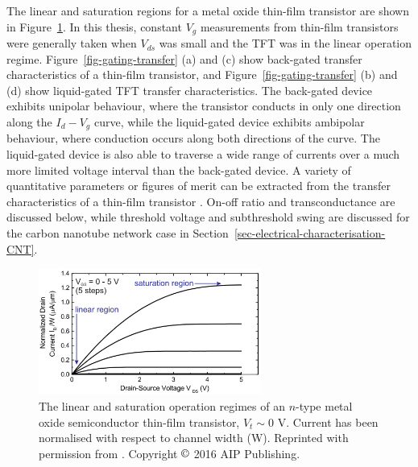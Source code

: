 \documentclass[
  a4paper,
]{scrbook}
\begin{document}
The linear and saturation regions for a metal oxide thin-film transistor
are shown in Figure~\ref{fig-linear-region}. In this thesis, constant
\(V_g\) measurements from thin-film transistors were generally taken
when \(V_{ds}\) was small and the TFT was in the linear operation
regime. Figure~\ref{fig-gating-transfer} (a) and (c) show back-gated
transfer characteristics of a thin-film transistor, and
Figure~\ref{fig-gating-transfer} (b) and (d) show liquid-gated TFT
transfer characteristics. The back-gated device exhibits unipolar
behaviour, where the transistor conducts in only one direction along the
\(I_d - V_g\) curve, while the liquid-gated device exhibits ambipolar
behaviour, where conduction occurs along both directions of the curve.
The liquid-gated device is also able to traverse a wide range of
currents over a much more limited voltage interval than the back-gated
device. A variety of quantitative parameters or figures of merit can be
extracted from the transfer characteristics of a thin-film transistor
\autocite{Petti2016}. On-off ratio and transconductance are discussed
below, while threshold voltage and subthreshold swing are discussed for
the carbon nanotube network case in
Section~\ref{sec-electrical-characterisation-CNT}.

\begin{figure}

{\centering \includegraphics[width=0.65\textwidth,height=\textheight]{figures/ch2/linear_region_edit.png}

}

\caption[The linear and saturation operation regimes of an \(n\)-type
metal oxide semiconductor thin-film
transistor.]{\label{fig-linear-region}The linear and saturation
operation regimes of an \(n\)-type metal oxide semiconductor thin-film
transistor, \(V_{t} \sim 0\) V. Current has been normalised with respect
to channel width (W). Reprinted with permission from
\autocite{Petti2016}. Copyright \(\copyright\) 2016 AIP Publishing.}

\end{figure}
\end{document}
